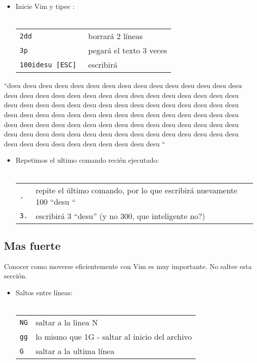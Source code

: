 \begin{itemize}
	\item Inicie Vim y tipee : \\ \\
\begin{tabular}{ l l }
	\texttt{2dd} & borrará 2 líneas \\
	\texttt{3p} & pegará el texto 3 veces \\
	\texttt{100idesu [ESC] } & escribirá \\
\end{tabular}
\end{itemize}
“desu desu desu desu desu desu desu desu desu desu desu desu desu desu desu desu desu desu desu desu desu desu desu desu desu desu desu desu desu desu desu desu desu desu desu desu desu desu desu desu desu desu desu desu desu desu desu desu desu desu desu desu desu desu desu desu desu desu desu desu desu desu desu desu desu desu desu desu desu desu desu desu desu desu desu desu desu desu desu desu desu desu desu desu desu desu desu desu desu desu desu desu desu desu desu desu desu desu desu desu “
\begin{itemize}
	\item Repetimos el ultimo comando recién ejecutado: \\ \\
\begin{tabular}{ l l }
	\texttt{.} & repite el último comando, por lo que escribirá nuevamente 100 “desu “ \\
	\texttt{3.} & escribirá 3 “desu” (y no 300, que inteligente no?) \\
\end{tabular}
\end{itemize}



\subsection{Mas fuerte}

Conocer como moverse eficientemente con Vim es muy importante. No saltee esta
sección.

\begin{itemize}
	\item Saltos entre líneas:  \\ \\
\begin{tabular}{ l l }
	\texttt{NG} & saltar a la linea N \\
	\texttt{gg} & lo mismo que 1G - saltar al inicio del archivo \\
	\texttt{G} & saltar a la ultima línea \\
\end{tabular}
\end{itemize}




